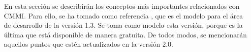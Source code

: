 En esta sección se describirán los conceptos más importantes relacionados con CMMI. Para ello, se ha tomado como referencia \cite{ProductCMMIfor2010}, que es el modelo para el área de desarrollo de la versión 1.3. Se toma como modelo esta versión, porque es la última que está disponible de manera gratuita. De todos modos, se mencionarán aquellos puntos que estén actualizados en la versión 2.0.

